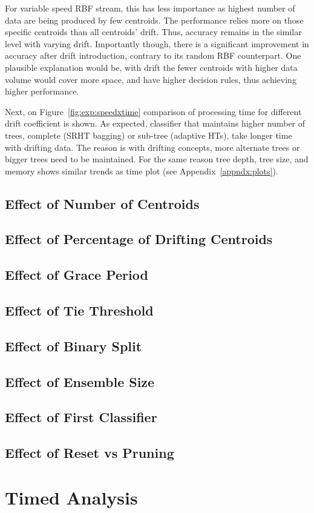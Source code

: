 For variable speed RBF stream, this has less importance as highest number of data are being produced by few centroids. The performance relies more on those specific centroids than all centroids' drift. Thus, accuracy remains in the similar level with varying drift. Importantly though, there is a significant improvement in accuracy after drift introduction, contrary to its random RBF counterpart. One plausible explanation would be, with drift the fewer centroids with higher data volume would cover more space, and have higher decision rules, thus achieving higher performance.

Next, on Figure~\ref{fig:exp:speedxtime} comparison of processing time for different drift coefficient is shown. As expected, classifier that maintains higher number of trees, complete (SRHT bagging) or sub-tree (adaptive HTs), take longer time with drifting data. The reason is with drifting concepts, more alternate trees or bigger trees need to be maintained. For the same reason tree depth, tree size, and memory shows similar trends as time plot (see Appendix~\ref{appndx:plots}).


\subsection{Effect of Number of Centroids}
\subsection{Effect of Percentage of Drifting Centroids}

\subsection{Effect of Grace Period}
\subsection{Effect of Tie Threshold}
\subsection{Effect of Binary Split}

\subsection{Effect of Ensemble Size}

\subsection{Effect of First Classifier}
\subsection{Effect of Reset vs Pruning}

\section{Timed Analysis}

